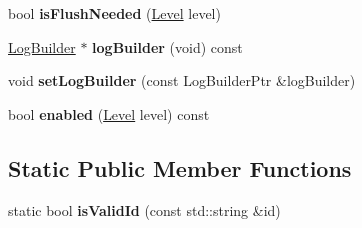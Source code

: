 \begin{DoxyCompactItemize}
\item 
\hypertarget{classel_1_1Logger_abdf56c00388c71d1cbaa7e2df4449202}{bool {\bfseries is\-Flush\-Needed} (\hyperlink{namespaceel_ab0ac6091262344c52dd2d3ad099e8e36}{Level} level)}\label{classel_1_1Logger_abdf56c00388c71d1cbaa7e2df4449202}

\item 
\hypertarget{classel_1_1Logger_aead5b130c5141d2024740b03ab4b45d7}{\hyperlink{classel_1_1LogBuilder}{Log\-Builder} $\ast$ {\bfseries log\-Builder} (void) const }\label{classel_1_1Logger_aead5b130c5141d2024740b03ab4b45d7}

\item 
\hypertarget{classel_1_1Logger_a737340322cc9d9d20febd7131c1e262f}{void {\bfseries set\-Log\-Builder} (const Log\-Builder\-Ptr \&log\-Builder)}\label{classel_1_1Logger_a737340322cc9d9d20febd7131c1e262f}

\item 
\hypertarget{classel_1_1Logger_a5abaca24ac28bfd4806bea32be193435}{bool {\bfseries enabled} (\hyperlink{namespaceel_ab0ac6091262344c52dd2d3ad099e8e36}{Level} level) const }\label{classel_1_1Logger_a5abaca24ac28bfd4806bea32be193435}

\end{DoxyCompactItemize}
\subsection*{Static Public Member Functions}
\begin{DoxyCompactItemize}
\item 
\hypertarget{classel_1_1Logger_af6cf4f266ceb65da9563afd3706f26d6}{static bool {\bfseries is\-Valid\-Id} (const std\-::string \&id)}\label{classel_1_1Logger_af6cf4f266ceb65da9563afd3706f26d6}

\end{DoxyCompactItemize}
